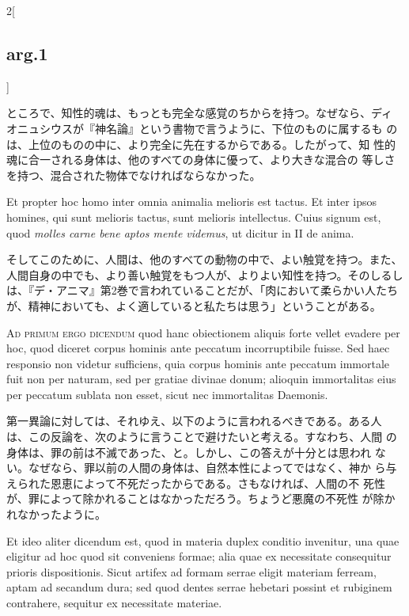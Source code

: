 \documentclass[paper=a4paper,fontsize=10pt,jafontsize=9pt,titlepage]{jlreq}
\begin{document}
\begin{paracol}{2}[\subsection{arg.1}]
\switchcolumn

 ところで、知性的魂は、もっとも完全な感覚のちからを持つ。なぜなら、ディ
 オニュシウスが『神名論』という書物で言うように、下位のものに属するも
 のは、上位のものの中に、より完全に先在するからである。したがって、知
 性的魂に合一される身体は、他のすべての身体に優って、より大きな混合の
 等しさを持つ、混合された物体でなければならなかった。
 
\switchcolumn*


 Et propter hoc homo inter omnia animalia melioris est tactus. Et
 inter ipsos homines, qui sunt melioris tactus, sunt melioris
 intellectus. Cuius signum est, quod {\itshape molles carne bene aptos
 mente videmus}, ut dicitur in II de anima.

\switchcolumn

そしてこのために、人間は、他のすべての動物の中で、よい触覚を持つ。また、人間自身の中でも、より善い触覚をもつ人が、よりよい知性を持つ。そのしるしは、『デ・アニマ』第2巻で言われていることだが、「肉において柔らかい人たちが、精神においても、よく適していると私たちは思う」ということがある。
 
\switchcolumn*[\subsection{ad 1}]



 {\scshape Ad primum ergo dicendum} quod hanc obiectionem aliquis
 forte vellet evadere per hoc, quod diceret corpus hominis ante
 peccatum incorruptibile fuisse. Sed haec responsio non videtur
 sufficiens, quia corpus hominis ante peccatum immortale fuit non per
 naturam, sed per gratiae divinae donum; alioquin immortalitas eius
 per peccatum sublata non esset, sicut nec immortalitas Daemonis.

\switchcolumn

 第一異論に対しては、それゆえ、以下のように言われるべきである。ある人
 は、この反論を、次のように言うことで避けたいと考える。すなわち、人間
 の身体は、罪の前は不滅であった、と。しかし、この答えが十分とは思われ
 ない。なぜなら、罪以前の人間の身体は、自然本性によってではなく、神か
 ら与えられた恩恵によって不死だったからである。さもなければ、人間の不
 死性が、罪によって除かれることはなかっただろう。ちょうど悪魔の不死性
 が除かれなかったように。
 
\switchcolumn*


 Et ideo aliter dicendum est, quod in materia duplex conditio
 invenitur, una quae eligitur ad hoc quod sit conveniens formae; alia
 quae ex necessitate consequitur prioris dispositionis. Sicut artifex
 ad formam serrae eligit materiam ferream, aptam ad secandum dura; sed
 quod dentes serrae hebetari possint et rubiginem contrahere, sequitur
 ex necessitate materiae.


\end{paracol}
\end{document}
